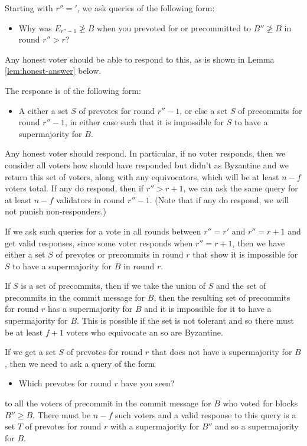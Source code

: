 \documentclass{article}
\begin{document}
Starting with $r''='$, we ask queries of the following form: 
\begin{itemize}
\item Why was $E_{r''-1} \not\geq B$  when you prevoted for or precommitted to $B'' \not\geq B$ in round $r'' > r$?
\end{itemize}
\noindent Any honest voter should be able to respond to this, as is shown in Lemma \ref{lem:honest-answer} below. 

The response is of the following form:
\begin{itemize}
\item A either a set $S$ of prevotes for round $r''-1$, or else a set $S$ of precommits for round $r''-1$, in either case such that it is impossible for $S$ to have a supermajority for $B$.
\end{itemize}

Any honest voter should respond.  In particular, if no voter responds, then we consider all  voters how should have responded but didn't as Byzantine and we return this set of voters, along with any equivocators, which will be at least $n-f$ voters total. If any do respond, then if $r'' > r+1$, we can ask the same query for at least $n-f$ validators in round $r''-1$. (Note that if any do respond, we will not punish non-responders.)

If we ask such queries for a vote in all rounds between $r''=r'$ and $r''=r+1$ and get valid responses, since some voter responds when $r''=r+1$, then we have either a set $S$ of prevotes or precommits in round $r$ that show it is impossible for $S$ to have a supermajority for $B$ in round $r$.

If $S$ is a set of precommits, then if we take the union of $S$ and the set of precommits in the commit message for $B$, then the resulting set of precommits for round $r$ has a supermajority for $B$ and it is impossible for it to have a supermajority for $B$. This is possible if the set is not tolerant and so there must be at least $f+1$ voters who equivocate an so are Byzantine.

If we get a set $S$ of prevotes for round $r$ that does not have a supermajority for $B$, then we need to ask a query of the form

\begin{itemize}
\item Which prevotes for round $r$ have you seen?
\end{itemize}
\noindent to all the voters of precommit in the commit message for $B$  who voted for blocks $B'' \geq B$. There must be $n-f$ such voters and a valid response to this query is a set $T$ of prevotes for round $r$ with a supermajority for $B''$ and so a supermajority for $B$.
\end{document}

